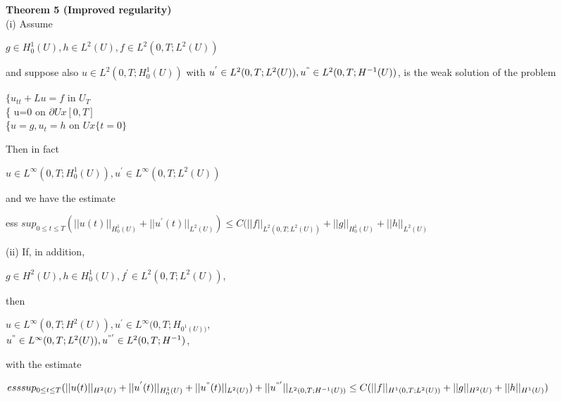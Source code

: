 \documentclass{article}
\newcommand\tab[1][1cm]{\hspace*{#1}}
\begin{document}
\textbf {Theorem 5 (Improved regularity)} \\ \tab (i) Assume
\begin{center}
$g \in H_{0}^{1} (U), h \in L^2(U), f \in L^2(0, T; L^2(U))$
\end{center}
and suppose also $u \in L^2(0, T; H_{0}^{1}(U))$ with $u^{'} \in L^2(0, T; L^2(U)), u^{"} \in L^2(0, T; H^{-1}(U))$, is the weak solution of the problem
\begin{center}
$\{ u_{tt} + Lu = f$ \tab in $U_T$ \\
\{ \tab u=0 \tab on $\partial U x [0,T]$ \\
\{$u = g, u_t = h$ \tab on $U x \{t=0\}$
\end{center}
Then in fact
\begin{center}
$u \in L^{\infty}(0, T; H_{0}^{1}(U)), u^{'} \in L^{\infty} (0, T; L^2(U))$
\end{center}
and we have the estimate
\begin{center}
ess $sup_{0 \leq t \leq T} (||u(t)||_{H_{0}^{1}(U)} + ||u^{'}(t)||_{L^{2}(U)}) \leq C(||f||_{L^{2}(0, T; L^{2}(U))} + ||g||_{H_{0}^{1}(U)} + ||h||_{L^{2}(U)}$
\end{center}
\tab (ii) If, in addition, 
\begin{center}
$g \in H^2(U), h \in H_{0}^{1}(U), f^{'} \in L^2(0, T; L^2(U))$,
\end{center}
then
\begin{center}
$u \in L^{\infty}(0, T; H^2(U)), u^{'} \in L^{\infty} (0, T; H_{{0}^{1}(U))},$ \\ 
$u^{"} \in L^{\infty}(0, T; L^2(U)), u^{"'} \in L^{2}(0, T; H^{-1})$,
\end{center}
with the estimate
\begin{center}
$ess sup_{0 \leq t \leq T} (||u(t)||_{H^{2}(U)} + ||u^{'}(t)||_{H_{0}^{1}(U)} + ||u^{"}(t)||_{L^{2}(U)}) + ||u^{"'}||_{L^{2}(0, T; H^{-1}(U))} \leq C(||f||_{H^{1}(0, T; L^{2}(U))} + ||g||_{H^{2}(U)} + ||h||_{H^{1}(U)})$ 
\end{center}
\end{document}
